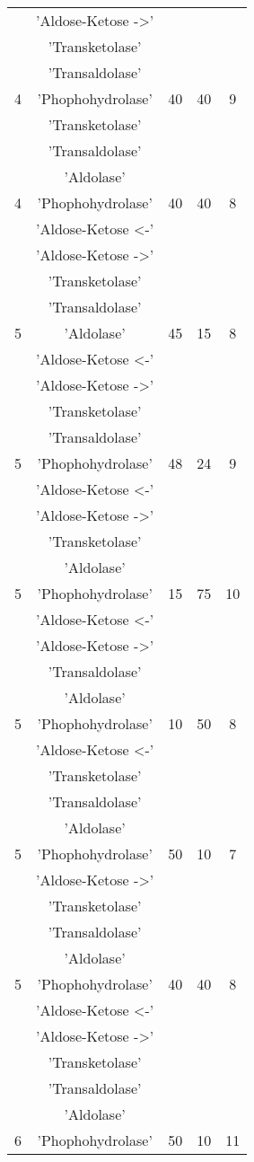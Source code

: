 \begin{center}
\begin{longtable}{ |c|c|c|c|c| }
 \hline
 & 'Aldose-Ketose ->' & & & \\
 & 'Transketolase' & & & \\
 & 'Transaldolase' & & & \\
4 & 'Phophohydrolase' & 40 & 40 & 9\\
 \hline
 & 'Transketolase' & & & \\
 & 'Transaldolase' & & & \\
 & 'Aldolase' & & & \\
4 & 'Phophohydrolase' & 40 & 40 & 8\\
 \hline
 & 'Aldose-Ketose <-' & & & \\
 & 'Aldose-Ketose ->' & & & \\
 & 'Transketolase' & & & \\
 & 'Transaldolase' & & & \\
5 & 'Aldolase' & 45 & 15 & 8\\
 \hline
 & 'Aldose-Ketose <-' & & & \\
 & 'Aldose-Ketose ->' & & & \\
 & 'Transketolase' & & & \\
 & 'Transaldolase' & & & \\
5 & 'Phophohydrolase' & 48 & 24 & 9\\
 \hline
 & 'Aldose-Ketose <-' & & & \\
 & 'Aldose-Ketose ->' & & & \\
 & 'Transketolase' & & & \\
 & 'Aldolase' & & & \\
5 & 'Phophohydrolase' & 15 & 75 & 10\\
 \hline
 & 'Aldose-Ketose <-' & & & \\
 & 'Aldose-Ketose ->' & & & \\
 & 'Transaldolase' & & & \\
 & 'Aldolase' & & & \\
5 & 'Phophohydrolase' & 10 & 50 & 8\\
 \hline
 & 'Aldose-Ketose <-' & & & \\
 & 'Transketolase' & & & \\
 & 'Transaldolase' & & & \\
 & 'Aldolase' & & & \\
5 & 'Phophohydrolase' & 50 & 10 & 7\\
 \hline
 & 'Aldose-Ketose ->' & & & \\
 & 'Transketolase' & & & \\
 & 'Transaldolase' & & & \\
 & 'Aldolase' & & & \\
5 & 'Phophohydrolase' & 40 & 40 & 8\\
 \hline
 & 'Aldose-Ketose <-' & & & \\
 & 'Aldose-Ketose ->' & & & \\
 & 'Transketolase' & & & \\
 & 'Transaldolase' & & & \\
 & 'Aldolase' & & & \\
6 & 'Phophohydrolase' & 50 & 10 & 11\\
 \hline
\end{longtable}
\end{center}
